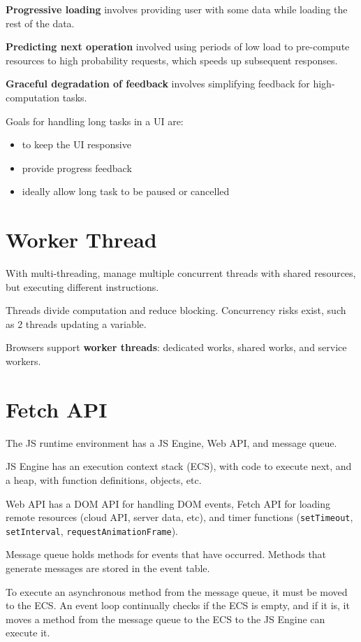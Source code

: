 \documentclass[11pt]{article}
\begin{document}
\textbf{Progressive loading} involves providing user with some data while loading the rest of the data.

\textbf{Predicting next operation} involved using periods of low load to pre-compute resources to high
probability requests, which speeds up subsequent responses.

\textbf{Graceful degradation of feedback} involves simplifying feedback for high-computation tasks.

Goals for handling long tasks in a UI are:
\begin{itemize}
\item to keep the UI responsive
\item provide progress feedback
\item ideally allow long task to be paused or cancelled
\end{itemize}
\section{Worker Thread}
\label{sec:org525c182}
With multi-threading, manage multiple concurrent threads with shared resources, but executing
different instructions.

Threads divide computation and reduce blocking.
Concurrency risks exist, such as 2 threads updating a variable.

Browsers support \textbf{worker threads}: dedicated works, shared works, and service workers.
\section{Fetch API}
\label{sec:orgafdb80e}
The JS runtime environment has a JS Engine, Web API, and message queue.

JS Engine has an execution context stack (ECS), with code to execute next, and a heap, with
function definitions, objects, etc.

Web API has a DOM API for handling DOM events, Fetch API for loading remote resources (cloud API,
server data, etc), and timer functions (\texttt{setTimeout}, \texttt{setInterval}, \texttt{requestAnimationFrame}).

Message queue holds methods for events that have occurred. Methods that generate messages are stored
in the event table.

To execute an asynchronous method from the message queue, it must be moved to the ECS.
An event loop continually checks if the ECS is empty, and if it is, it moves a method from the
message queue to the ECS to the JS Engine can execute it.
\end{document}
